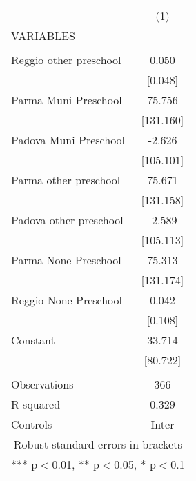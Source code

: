 \begin{tabular}{lc} \hline
 & (1) \\
VARIABLES &  \\ \hline
 &  \\
Reggio other preschool & 0.050 \\
 & [0.048] \\
Parma Muni Preschool & 75.756 \\
 & [131.160] \\
Padova Muni Preschool & -2.626 \\
 & [105.101] \\
Parma other preschool & 75.671 \\
 & [131.158] \\
Padova other preschool & -2.589 \\
 & [105.113] \\
Parma None Preschool & 75.313 \\
 & [131.174] \\
Reggio None Preschool & 0.042 \\
 & [0.108] \\
Constant & 33.714 \\
 & [80.722] \\
 &  \\
Observations & 366 \\
R-squared & 0.329 \\
 Controls & Inter \\ \hline
\multicolumn{2}{c}{ Robust standard errors in brackets} \\
\multicolumn{2}{c}{ *** p$<$0.01, ** p$<$0.05, * p$<$0.1} \\
\end{tabular}
